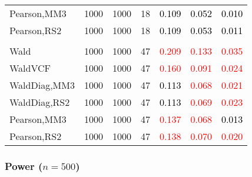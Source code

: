 \documentclass[
]{article}
\begin{document}
\begin{table}[H]
{\begin{tabular}[t]{lrrrrrr}
\hspace{1em}Pearson,MM3 & 1000 & 1000 & 18 & \textcolor{black}{0.109} & \textcolor{black}{0.052} & \textcolor{black}{0.010}\\
\hspace{1em}Pearson,RS2 & 1000 & 1000 & 18 & \textcolor{black}{0.109} & \textcolor{black}{0.053} & \textcolor{black}{0.011}\\
\addlinespace[0.3em]
\multicolumn{7}{l}{\textbf{3F 15V}}\\
\hspace{1em}Wald & 1000 & 1000 & 47 & \textcolor{red}{0.209} & \textcolor{red}{0.133} & \textcolor{red}{0.035}\\
\hspace{1em}WaldVCF & 1000 & 1000 & 47 & \textcolor{red}{0.160} & \textcolor{red}{0.091} & \textcolor{red}{0.024}\\
\hspace{1em}WaldDiag,MM3 & 1000 & 1000 & 47 & \textcolor{black}{0.113} & \textcolor{red}{0.068} & \textcolor{red}{0.021}\\
\hspace{1em}WaldDiag,RS2 & 1000 & 1000 & 47 & \textcolor{black}{0.113} & \textcolor{red}{0.069} & \textcolor{red}{0.023}\\
\hspace{1em}Pearson,MM3 & 1000 & 1000 & 47 & \textcolor{red}{0.137} & \textcolor{red}{0.068} & \textcolor{black}{0.013}\\
\hspace{1em}Pearson,RS2 & 1000 & 1000 & 47 & \textcolor{red}{0.138} & \textcolor{red}{0.070} & \textcolor{red}{0.020}\\
\bottomrule
\end{tabular}}
\endgroup{}
\end{table}

\hypertarget{power-n500-2}{%
\subsubsection{\texorpdfstring{Power
(\(n=500\))}{Power (n=500)}}\label{power-n500-2}}
\end{document}
